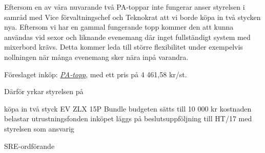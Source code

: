 \documentclass[../_main/handlingar.tex]{subfiles}
\def\sreordf{Pontus Landgren}
\begin{document}

Eftersom en av våra nuvarande två PA-toppar inte fungerar anser styrelsen i samråd med Vice förvaltningschef och Teknokrat att vi borde köpa in två stycken nya. Eftersom vi har en gammal fungerande topp kommer den att kunna användas vid sexor och liknande evenemang där inget fullständigt system med mixerbord krävs. Detta kommer leda till större flexibilitet under exempelvis nollningen när många evenemang sker nära inpå varandra. 

Föreslaget inköp: \href{https://www.thomann.de/se/ev_zlx_15p_bundle_2.htm?ref=search_rslt_EV+ZLX+15P_340452_2}{\textit{PA-topp}}, med ett pris på 4 461,58 kr/st.


Därför yrkar styrelsen på

\begin{attsatser}
    \att köpa in två styck EV ZLX 15P Bundle
    \att budgeten sätts till 10 000 kr 
    \att kostnaden belastar utrustningsfonden
    \att inköpet läggs på beslutsuppföljning till HT/17 med styrelsen som ansvarig 
    
\end{attsatser}

\begin{signatures}{1}
    \ist
    \signature{\sreordf}{SRE-ordförande}
\end{signatures}
\end{document}

